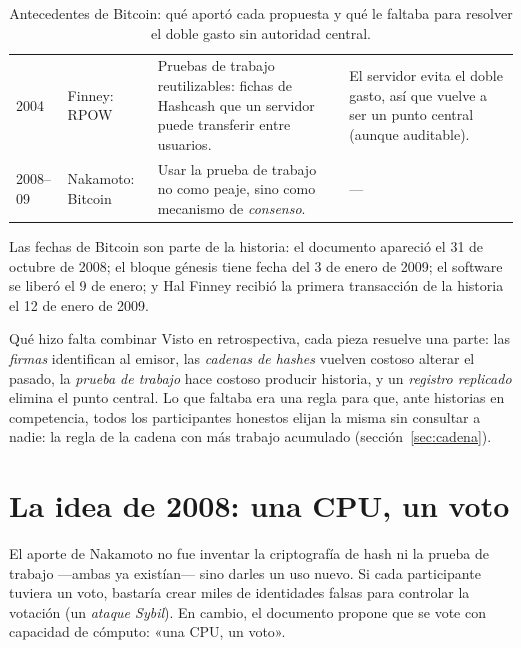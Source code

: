 \documentclass[11pt,a4paper]{article}
\newcommand{\webhint}[1]{}
\begin{document}
\begin{table}[tbp]
\begin{tabularx}{\linewidth}{@{}l>{\raggedright\arraybackslash}p{2.9cm}>{\raggedright\arraybackslash}X>{\raggedright\arraybackslash}X@{}}
2004 & Finney: RPOW \cite{finney2004} & Pruebas de trabajo reutilizables: fichas de Hashcash que un servidor puede transferir entre usuarios. & El servidor evita el doble gasto, así que vuelve a ser un punto central (aunque auditable).\\
2008--09 & Nakamoto: Bitcoin \cite{nakamoto2008} & Usar la prueba de trabajo no como peaje, sino como mecanismo de \emph{consenso}. & ---\\
\bottomrule
\end{tabularx}
\caption{Antecedentes de Bitcoin: qué aportó cada propuesta y qué le faltaba para resolver el doble gasto sin autoridad central.}\label{tab:antecedentes}
\end{table}

Las fechas de Bitcoin son parte de la historia: el documento apareció el 31 de octubre de 2008; el bloque génesis tiene fecha del 3 de enero de 2009; el software se liberó el 9 de enero; y Hal Finney recibió la primera transacción de la historia el 12 de enero de 2009.

\begin{nota}{Qué hizo falta combinar}
Visto en retrospectiva, cada pieza resuelve una parte: las \emph{firmas} identifican al emisor, las \emph{cadenas de hashes} vuelven costoso alterar el pasado, la \emph{prueba de trabajo} hace costoso producir historia, y un \emph{registro replicado} elimina el punto central. Lo que faltaba era una regla para que, ante historias en competencia, todos los participantes honestos elijan la misma sin consultar a nadie: la regla de la cadena con más trabajo acumulado (sección~\ref{sec:cadena}).
\end{nota}

\section{La idea de 2008: una CPU, un voto}\label{sec:cpu-un-voto}
\webhint{section; id=sec-idea-2008; slug=una-cpu-un-voto; kicker=03 — la idea de 2008; role=narrative}

El aporte de Nakamoto no fue inventar la criptografía de hash ni la prueba de trabajo ---ambas ya existían--- sino darles un uso nuevo. Si cada participante tuviera un voto, bastaría crear miles de identidades falsas para controlar la votación (un \emph{ataque Sybil}). En cambio, el documento propone que se vote con capacidad de cómputo: «una CPU, un voto».
\end{document}
